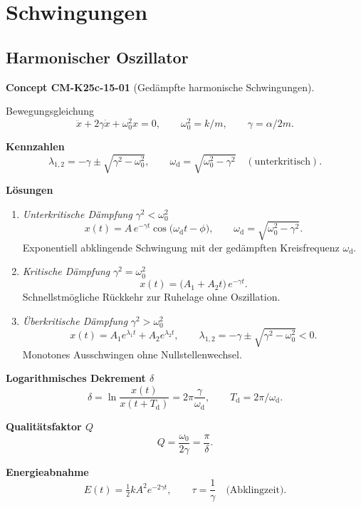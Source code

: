 \documentclass[10pt, letterpaper]{article}
\newcommand{\CustomHeading}[3]{%
  \par\medskip\noindent%
  \textbf{#1 #2} \textnormal{(#3)}.\enskip%
}
\newenvironment{CONC}[2]{\CustomHeading{Concept}{#1}{#2}}{}
\begin{document}
\section{Schwingungen}

\subsection{Harmonischer Oszillator}

\begin{CONC}{CM-K25c-15-01}{Gedämpfte harmonische Schwingungen}
Bewegungsgleichung  
\[
\ddot x + 2\gamma\dot x + \omega_{0}^{2}x = 0,
\qquad
\omega_{0}^{2}=k/m,
\qquad
\gamma=\alpha/2m .
\]

\textbf{Kennzahlen}  
\[
\lambda_{1,2}=-\gamma\pm\sqrt{\gamma^{2}-\omega_{0}^{2}},
\qquad
\omega_{\text{d}}=\sqrt{\omega_{0}^{2}-\gamma^{2}}\quad
(\text{unterkritisch}) .
\]

\textbf{Lösungen}

\begin{enumerate}
  \item \emph{Unterkritische Dämpfung} \(\gamma^{2}<\omega_{0}^{2}\)  
        \[
          x(t)=A\,e^{-\gamma t}\cos\!\bigl(\omega_{\mathrm d}t-\phi\bigr),
          \qquad
          \omega_{\mathrm d}=\sqrt{\omega_{0}^{2}-\gamma^{2}} .
        \]
        Exponentiell abklingende Schwingung mit der gedämpften Kreisfrequenz
        \(\omega_{\mathrm d}\).

  \item \emph{Kritische Dämpfung} \(\gamma^{2}=\omega_{0}^{2}\)  
        \[
          x(t)=\bigl(A_{1}+A_{2}t\bigr)\,e^{-\gamma t}.
        \]
        Schnellstmögliche Rückkehr zur Ruhelage ohne Oszillation.

  \item \emph{Überkritische Dämpfung} \(\gamma^{2}>\omega_{0}^{2}\)  
        \[
          x(t)=A_{1}e^{\lambda_{1}t}+A_{2}e^{\lambda_{2}t},
          \qquad
          \lambda_{1,2}=-\gamma\pm\sqrt{\gamma^{2}-\omega_{0}^{2}}<0 .
        \]
        Monotones Ausschwingen ohne Nullstellenwechsel.
\end{enumerate}


\textbf{Logarithmisches Dekrement \(\delta\)}  
\[
\delta=\ln\frac{x(t)}{x(t+T_{\text{d}})}
      =2\pi\frac{\gamma}{\omega_{\text{d}}},
\qquad
T_{\text{d}}=2\pi/\omega_{\text{d}} .
\]

\textbf{Qualitätsfaktor \(Q\)}  
\[
Q=\frac{\omega_{0}}{2\gamma}
  =\frac{\pi}{\delta}.
\]

\textbf{Energieabnahme}  
\[
E(t)=\tfrac12kA^{2}e^{-2\gamma t},
\qquad
\tau=\frac{1}{\gamma}\quad\text{(Abklingzeit)}.
\]
\end{CONC}
\end{document}
